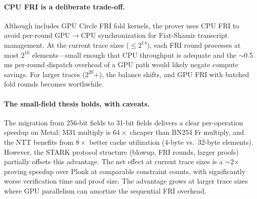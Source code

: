 \paragraph{CPU FRI is a deliberate trade-off.}
Although \sys includes GPU Circle FRI fold kernels, the prover uses CPU FRI
to avoid per-round GPU$\to$CPU synchronization for Fiat-Shamir transcript
management.  At the current trace sizes ($\leq 2^{14}$), each FRI round
processes at most $2^{16}$ elements---small enough that CPU throughput
is adequate and the ${\sim}$0.5\,ms per-round dispatch overhead of a GPU
path would likely negate compute savings.  For larger traces ($2^{20}$+),
the balance shifts, and GPU FRI with batched fold rounds becomes
worthwhile.

\paragraph{The small-field thesis holds, with caveats.}
The migration from 256-bit fields to 31-bit fields delivers a clear
per-operation speedup on Metal: M31 multiply is $64\times$ cheaper than
BN254 Fr multiply, and the NTT benefits from $8\times$ better cache
utilization (4-byte vs.\ 32-byte elements).  However, the STARK protocol
structure (blowup, FRI rounds, larger proofs) partially offsets this
advantage.  The net effect at current trace sizes is a ${\sim}$2$\times$
proving speedup over Plonk at comparable constraint counts, with
significantly worse verification time and proof size.  The advantage
grows at larger trace sizes where GPU parallelism can amortize the
sequential FRI overhead.

